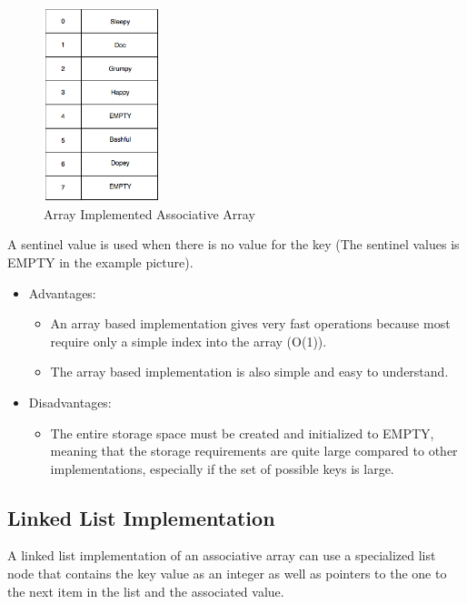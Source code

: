 \begin{figure}[H]
\centering
\includegraphics[width=0.3\textwidth]{pictures/image004.png}
\caption{Array Implemented Associative Array}
\label{fig:aa2}
\end{figure}

A sentinel value is used when there is no value for the key (The sentinel values is EMPTY in the example picture).      

\begin{itemize}
\item Advantages:
\begin{itemize}
	\item An array based implementation gives very fast operations because most require only a simple index into the array (O(1)).         
	\item The array based implementation is also simple and easy to understand.
\end{itemize}

\item Disadvantages:
\begin{itemize}
	\item The entire storage space must be created and initialized to EMPTY, meaning that the storage requirements are quite large compared to other implementations, especially if the set of possible keys is large.
\end{itemize}
\end{itemize}

\subsection{Linked List Implementation}


A linked list implementation of an associative array can use  a specialized list node that contains  the key value as an integer as well as pointers to the one to the next item in the list and  the associated value.

